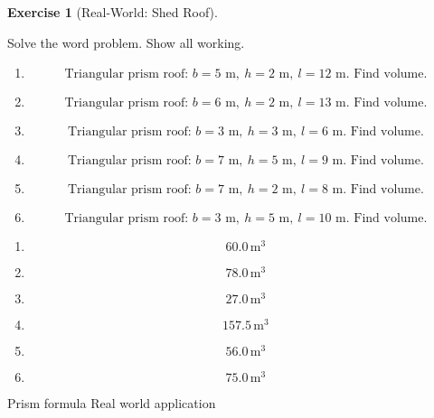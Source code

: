 \documentclass[
  letterpaper,
  DIV=11,
  numbers=noendperiod]{scrreprt}
\theoremstyle{definition}
\newtheorem{exercise}{Exercise}[chapter]
\theoremstyle{remark}
\begin{document}
\begin{exercise}[Real-World: Shed
Roof]\protect\hypertarget{exr-comp-11}{}\label{exr-comp-11}

Solve the word problem. Show all working.

\begin{enumerate}
\def\labelenumi{\alph{enumi})}
\item
  \[\text{Triangular prism roof: }b=5\text{ m},\ h=2\text{ m},\ l=12\text{ m. Find volume.}\]
\item
  \[\text{Triangular prism roof: }b=6\text{ m},\ h=2\text{ m},\ l=13\text{ m. Find volume.}\]
\item
  \[\text{Triangular prism roof: }b=3\text{ m},\ h=3\text{ m},\ l=6\text{ m. Find volume.}\]
\item
  \[\text{Triangular prism roof: }b=7\text{ m},\ h=5\text{ m},\ l=9\text{ m. Find volume.}\]
\item
  \[\text{Triangular prism roof: }b=7\text{ m},\ h=2\text{ m},\ l=8\text{ m. Find volume.}\]
\item
  \[\text{Triangular prism roof: }b=3\text{ m},\ h=5\text{ m},\ l=10\text{ m. Find volume.}\]
\end{enumerate}

\begin{tcolorbox}[enhanced jigsaw, opacitybacktitle=0.6, coltitle=black, arc=.35mm, colframe=quarto-callout-tip-color-frame, colback=white, bottomrule=.15mm, left=2mm, colbacktitle=quarto-callout-tip-color!10!white, titlerule=0mm, opacityback=0, title=\textcolor{quarto-callout-tip-color}{\faLightbulb}\hspace{0.5em}{🔍 View Solution}, leftrule=.75mm, breakable, rightrule=.15mm, bottomtitle=1mm, toptitle=1mm, toprule=.15mm]

\begin{enumerate}
\def\labelenumi{\alph{enumi})}
\item
  \[60.0\,\text{m}^{3}\]
\item
  \[78.0\,\text{m}^{3}\]
\item
  \[27.0\,\text{m}^{3}\]
\item
  \[157.5\,\text{m}^{3}\]
\item
  \[56.0\,\text{m}^{3}\]
\item
  \[75.0\,\text{m}^{3}\]
\end{enumerate}

\end{tcolorbox}

{Prism formula} {Real world application}

\end{exercise}
\end{document}
